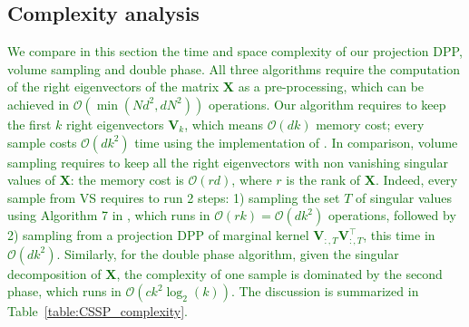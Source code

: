 \documentclass[twoside,11pt]{book}
\newcommand{\rev}[1]{\textcolor{darkgreen}{#1}}
\numberwithin{theorem}{chapter}
\numberwithin{definition}{chapter}
\numberwithin{proposition}{chapter}
\numberwithin{corollary}{chapter}
\numberwithin{example}{chapter}
\numberwithin{lemma}{chapter}
\DeclareMathOperator{\Tran}{\intercal}
\begin{document}
\subsection{Complexity analysis}\label{sec:complexity}
\rev{We compare in this section the time and space complexity of our projection DPP, volume sampling and double phase.
All three algorithms require the computation of the right eigenvectors of the matrix $\bm{X}$ as a pre-processing, which can be achieved in $\mathcal{O}(\min(N d^{2},dN^{2}))$ operations.
Our algorithm requires to keep the first $k$ right eigenvectors $\bm{V}_{k}$, which means $\mathcal{O}(dk)$ memory cost; every sample costs $\mathcal{O}(dk^{2})$ time using the implementation of \cite{TrBaAm18}.}
\rev{In comparison, volume sampling requires to keep all the right eigenvectors with non vanishing singular values of $\bm{X}$: the memory cost is $\mathcal{O}(r d)$, where $r$ is the rank of $\bm{X}$.
Indeed, every sample from VS requires to run 2 steps: 1) sampling the set $T$ of singular values using Algorithm 7 in \citep{KuTa12}, which runs in $\mathcal{O}(rk) = \mathcal{O}(dk^{2})$ operations, followed by 2) sampling from a projection DPP of marginal kernel $\bm{V}_{:,T}^{\phantom{\Tran}}\bm{V}_{:,T}^{\Tran}$, this time in $\mathcal{O}(dk^{2})$.
%
Similarly, for the double phase algorithm, given the singular decomposition of $\bm{X}$, the complexity of one sample is dominated by the second phase, which runs in $\mathcal{O}(c k^{2} \log_{2}(k))$. The discussion is summarized in Table~\ref{table:CSSP_complexity}.}
\end{document}
